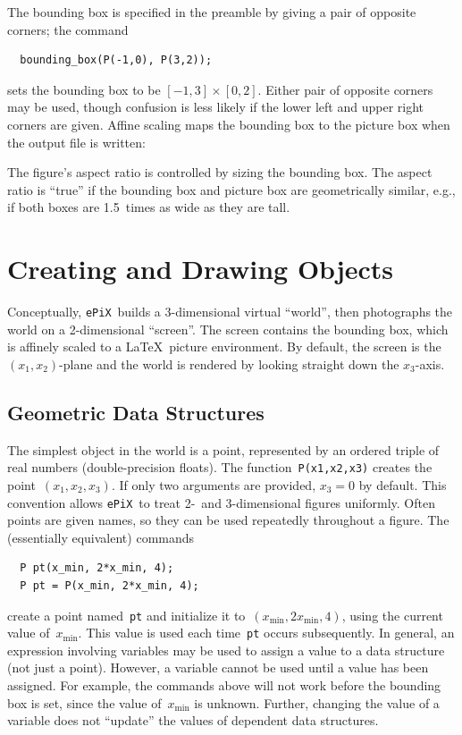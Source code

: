 \documentclass[12pt]{report}
\newcommand{\code}[1]{\texttt{#1}}
\newcommand{\ePiX}{\code{ePiX}}
\begin{document}
The bounding box is specified in the preamble by giving a pair of
opposite corners; the command
\begin{verbatim}
  bounding_box(P(-1,0), P(3,2));
\end{verbatim}
sets the bounding box to be $[-1,3]\times[0,2]$. Either pair of
opposite corners may be used, though confusion is less likely if the
lower left and upper right corners are given.  Affine scaling maps the
bounding box to the picture box when the output file is written:
\begin{center}

\end{center}
\label{page:scaling}
The figure's aspect ratio is controlled by sizing the bounding box.
The aspect ratio is ``true'' if the bounding box and picture box are
geometrically similar, e.g., if both boxes are 1.5~times as wide as
they are tall.


\section{Creating and Drawing Objects}

Conceptually, \ePiX\ builds a 3-dimensional virtual ``world'', then
photographs the world on a 2-dimensional ``screen''. The screen
contains the bounding box, which is affinely scaled to a \LaTeX\ 
picture environment. By default, the screen is the $(x_1,x_2)$-plane
and the world is rendered by looking straight down the $x_3$-axis.
\index{Bounding Box|)}

\subsection*{Geometric Data Structures}

The simplest object in the world is a point, represented by an ordered
triple of real numbers (double-precision floats). The
function~\code{P(x1,x2,x3)} creates the point~$(x_1,x_2,x_3)$. If only
two arguments are provided, $x_3=0$ by default. This convention allows
\ePiX\ to treat 2-~and 3-dimensional figures uniformly.  Often points
are given names, so they can be used repeatedly throughout a figure.
The (essentially equivalent) commands
\begin{verbatim}
  P pt(x_min, 2*x_min, 4);
  P pt = P(x_min, 2*x_min, 4);
\end{verbatim}
create a point named~\code{pt} and initialize it
to~$(x_\mathrm{min},2x_\mathrm{min},4)$, using the current value
of~$x_\mathrm{min}$. This value is used each time~\code{pt} occurs
subsequently.  In general, an expression involving variables may be
used to assign a value to a data structure (not just a point).
However, a variable cannot be used until a value has been assigned.
For example, the commands above will not work before the bounding box
is set, since the value of~$x_\mathrm{min}$ is unknown. Further,
changing the value of a variable does not ``update'' the values of
dependent data structures.
\end{document}
